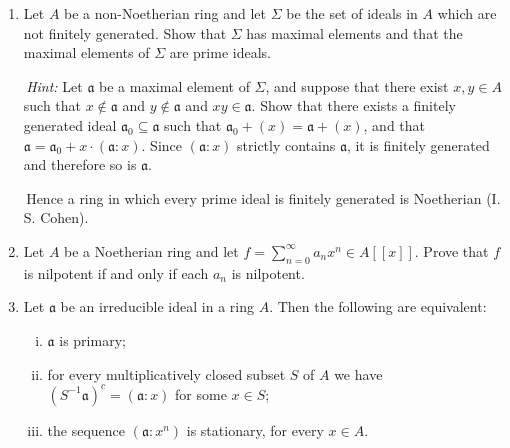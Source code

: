 
\begin{enumerate}
    \item \label{exer1-chapter7}Let $A$ be a non-Noetherian ring and let $\Sigma$ be the set of ideals in $A$ which are not finitely generated. Show that $\Sigma$ has maximal elements and that the maximal elements of $\Sigma$ are prime ideals.
    
    \quad\,\textit{Hint:} Let $\mathfrak{a}$ be a maximal element of $\Sigma$, and suppose that there exist $x, y \in A$ such that $x \notin \mathfrak{a}$ and $y \notin \mathfrak{a}$ and $xy \in \mathfrak{a}$. Show that there exists a finitely generated ideal $\mathfrak{a}_0 \subseteq \mathfrak{a}$ such that $\mathfrak{a}_0 + (x) = \mathfrak{a} + (x)$, and that $\mathfrak{a} = \mathfrak{a}_0 + x \cdot (\mathfrak{a}:x)$. Since $(\mathfrak{a}:x)$ strictly contains $\mathfrak{a}$, it is finitely generated and therefore so is $\mathfrak{a}$.

    \quad\,Hence a ring in which every prime ideal is finitely generated is Noetherian (I. S. Cohen).

    \item \label{exer2-chapter7}Let $A$ be a Noetherian ring and let $f = \sum_{n=0}^\infty a_n x^n \in A[[x]]$. Prove that $f$ is nilpotent if and only if each $a_n$ is nilpotent.

    \item \label{exer3-chapter7}Let $\mathfrak{a}$ be an irreducible ideal in a ring $A$. Then the following are equivalent:
    \begin{enumerate}[i)]
        \item $\mathfrak{a}$ is primary;
        \item for every multiplicatively closed subset $S$ of $A$ we have $(S^{-1}\mathfrak{a})^c = (\mathfrak{a}:x)$ for some $x \in S$;
        \item the sequence $(\mathfrak{a}:x^n)$ is stationary, for every $x \in A$.
    \end{enumerate}


\end{enumerate}
